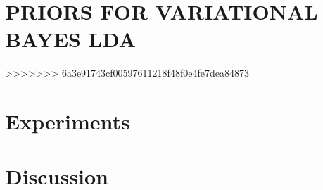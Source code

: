 \documentclass[twoside]{article}
\begin{document}
\section{PRIORS FOR VARIATIONAL BAYES LDA}
\label{sec:ldawithcprior}

>>>>>>> 6a3e91743cf00597611218f48f0e4fe7dea84873


\section{Experiments}
\section{Discussion}



\pagebreak %



\end{document}

